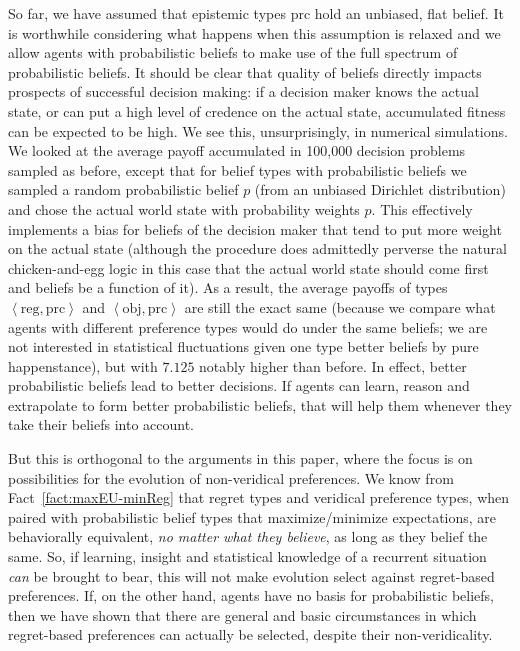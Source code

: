 \documentclass[fleqn,reqno,12pt]{article}
\theoremstyle{Satz}
\theoremstyle{Bsp}
\newcommand{\tuple}[1]{\left \langle #1\right\rangle}
\begin{document}
So far, we have assumed that epistemic types $\text{prc}$ hold an unbiased, flat belief. It is
worthwhile considering what happens when this assumption is relaxed and we allow agents with
probabilistic beliefs to make use of the full spectrum of probabilistic beliefs. It should be
clear that quality of beliefs directly impacts prospects of successful decision making: if a
decision maker knows the actual state, or can put a high level of credence on the actual state,
accumulated fitness can be expected to be high. We see this, unsurprisingly, in numerical
simulations. We looked at the average payoff accumulated in 100,000 decision problems sampled
as before, except that for belief types with probabilistic beliefs we sampled a random
probabilistic belief $p$ (from an unbiased Dirichlet distribution) and chose the actual world
state with probability weights $p$. This effectively implements a bias for beliefs of the
decision maker that tend to put more weight on the actual state (although the procedure does
admittedly perverse the natural chicken-and-egg logic in this case that the actual world state
should come first and beliefs be a function of it). As a result, the average payoffs of types
$\tuple{\text{reg}, \text{prc}}$ and $\tuple{\text{obj}, \text{prc}}$ are still the exact same
(because we compare what agents with different preference types would do under the same
beliefs; we are not interested in statistical fluctuations given one type better beliefs by
pure happenstance), but with $7.125$ notably higher than before. In effect, better
probabilistic beliefs lead to better decisions. If agents can learn, reason and extrapolate to
form better probabilistic beliefs, that will help them whenever they take their beliefs into
account. 

But this is orthogonal to the arguments in this paper, where the focus is on possibilities for
the evolution of non-veridical preferences. We know from Fact~\ref{fact:maxEU-minReg} that
regret types and veridical preference types, when paired with probabilistic belief types that
maximize/minimize expectations, are behaviorally equivalent, \emph{no matter what they believe},
as long as they belief the same. So, if learning, insight and statistical knowledge of a
recurrent situation \emph{can} be brought to bear, this will not make evolution select against
regret-based preferences. If, on the other hand, agents have no basis for probabilistic
beliefs, then we have shown that there are general and basic circumstances in which
regret-based preferences can actually be selected, despite their non-veridicality.
\fi
\end{document}
